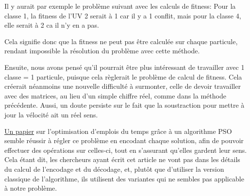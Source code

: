 Il y aurait par exemple le problème suivant avec les calculs de fitness: Pour la classe 1, la fitness de l'UV 2 serait à 1 car il y a 1 conflit, mais pour la classe 4, elle serait à 2 ca il n'y en a pas.

Cela signifie donc que la fitness ne peut pas être calculée sur chaque particule, rendant impossible la résolution du problème avec cette méthode.

Ensuite, nous avons pensé qu'il pourrait être plus intéressant de travailler avec 1 classe = 1 particule, puisque cela règlerait le problème de calcul de fitness. Cela créerait néanmoins une nouvelle difficulté à surmonter, celle de devoir travailler avec des matrices, au lieu d'un simple chiffre réel, comme dans la méthode précédente. Aussi, un doute persiste sur le fait que la soustraction pour mettre à jour la vélocité ait un réel sens. 

\href{https://www.scienceasia.org/2009.35.n1/scias35_89.pdf}{Un papier} sur l'optimisation d'emplois du temps grâce à un algorithme PSO semble réussir à régler ce problème en encodant chaque solution, afin de pouvoir effectuer des opérations sur celles-ci, tout en s'assurant qu'elles gardent leur sens. Cela étant dit, les chercheurs ayant écrit cet article ne vont pas dans les détails du calcul de l'encodage et du décodage, et, plutôt que d'utiliser la version classique de l'algorithme, ils utilisent des variantes qui ne sembles pas applicable à notre problème.

